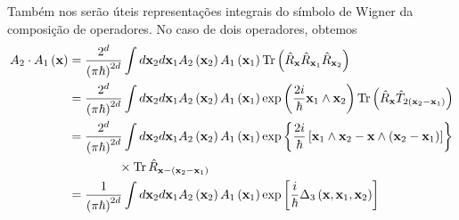 \documentclass[
	12pt,
	oneside,			%
	a4paper,			%
	english,			%
	brazil				%
	]{abntex2}
\theoremstyle{definition}
\begin{document}
Também nos serão úteis representações integrais do símbolo de Wigner da composição de operadores. No caso de dois operadores, obtemos
\begin{equation}
    \begin{aligned}
        A_2 \cdot A_1 \left(\mathbf{x}\right) &= \frac{2^d}{\left(\pi \hbar\right)^{2d}} \int d \mathbf{x}_2 d \mathbf{x}_1  A_2\left(\mathbf{x}_2\right) A_1\left(\mathbf{x}_1\right) \Tr \left( \hat{R}_\mathbf{x} \hat{R}_{\mathbf{x}_1} \hat{R}_{\mathbf{x}_2} \right) \\
        &= \frac{2^d}{\left(\pi \hbar\right)^{2d}} \int d \mathbf{x}_2 d \mathbf{x}_1  A_2\left(\mathbf{x}_2\right) A_1\left(\mathbf{x}_1\right) \exp\left(\frac{2i}{\hbar}\mathbf{x}_1 \wedge \mathbf{x}_2\right)\Tr \left( \hat{R}_\mathbf{x}  \hat{T}_{2(\mathbf{x}_2-\mathbf{x}_1)}  \right) \\
        &= \frac{2^d}{\left(\pi \hbar\right)^{2d}} \int d \mathbf{x}_2 d \mathbf{x}_1  A_2\left(\mathbf{x}_2\right) A_1\left(\mathbf{x}_1\right) \exp\left\{\frac{2i}{\hbar}\left[\mathbf{x}_1 \wedge \mathbf{x}_2 - \mathbf{x} \wedge (\mathbf{x}_2-\mathbf{x}_1)\right]\right\} \\ & \qquad \qquad \times \Tr  \hat{R}_{\mathbf{x}-(\mathbf{x}_2-\mathbf{x}_1)}  \\
        &= \frac{1}{\left(\pi \hbar\right)^{2d}} \int d \mathbf{x}_2 d \mathbf{x}_1  A_2\left(\mathbf{x}_2\right) A_1\left(\mathbf{x}_1\right) \exp\left[\frac{i}{\hbar}\Delta_3 \left(\mathbf{x},\mathbf{x}_1,\mathbf{x}_2\right)\right]
    \end{aligned}
\end{equation}
\end{document}
